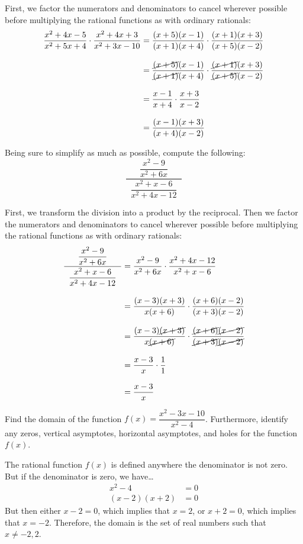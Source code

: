 \documentclass[12pt,letterpaper]{exam}
\begin{document}
\begin{questions}
\sol First, we factor the numerators and denominators to cancel wherever possible before multiplying the rational functions as with ordinary rationals:
	\[
	\begin{aligned}
	\dfrac{x^2 + 4x - 5}{x^2 + 5x + 4} \cdot \dfrac{x^2 + 4x + 3}{x^2 + 3x - 10}&= \dfrac{(x + 5)(x - 1)}{(x + 1)(x + 4)} \cdot \dfrac{(x + 1)(x + 3)}{(x + 5)(x - 2)} \\[0.3cm]
	&= \dfrac{\cancel{(x + 5)}(x - 1)}{\cancel{(x + 1)}(x + 4)} \cdot \dfrac{\cancel{(x + 1)}(x + 3)}{\cancel{(x + 5)}(x - 2)} \\[0.3cm]
	&= \dfrac{x - 1}{x + 4} \cdot \dfrac{x + 3}{x - 2} \\[0.3cm]
	&= \dfrac{(x - 1)(x + 3)}{(x + 4)(x - 2)}
	\end{aligned}
	\]



\newpage
\question[10] Being sure to simplify as much as possible, compute the following:
	\[
	\dfrac{\;\;\dfrac{x^2 - 9}{x^2 + 6x}\;\;}{\;\;\dfrac{x^2 + x - 6}{x^2 + 4x - 12}\;\;}
	\] \pspace

\sol First, we transform the division into a product by the reciprocal. Then we factor the numerators and denominators to cancel wherever possible before multiplying the rational functions as with ordinary rationals:
	\[
	\begin{aligned}
	\dfrac{\;\;\dfrac{x^2 - 9}{x^2 + 6x}\;\;}{\;\;\dfrac{x^2 + x - 6}{x^2 + 4x - 12}\;\;}&= \dfrac{x^2 - 9}{x^2 + 6x} \cdot \dfrac{x^2 + 4x - 12}{x^2 + x - 6} \\[0.3cm]
	&= \dfrac{(x - 3)(x + 3)}{x(x + 6)} \cdot \dfrac{(x + 6)(x - 2)}{(x + 3)(x - 2)} \\[0.3cm]
	&= \dfrac{(x - 3)\cancel{(x + 3)}}{x\cancel{(x + 6)}} \cdot \dfrac{\cancel{(x + 6)}\cancel{(x - 2)}}{\cancel{(x + 3)}\cancel{(x - 2)}} \\[0.3cm]
	&= \dfrac{x - 3}{x} \cdot \dfrac{1}{1} \\[0.3cm]
	&= \dfrac{x - 3}{x}
	\end{aligned}
	\]



\newpage
\question[10] Find the domain of the function $f(x)= \dfrac{x^2 - 3x - 10}{x^2 - 4}$. Furthermore, identify any zeros, vertical asymptotes, horizontal asymptotes, and holes for the function $f(x)$. \pspace

\sol The rational function $f(x)$ is defined anywhere the denominator is not zero. But if the denominator is zero, we have\dots
	\[
	\begin{aligned}
	x^2 - 4&= 0 \\[0.3cm]
	(x - 2)(x + 2)&= 0
	\end{aligned}
	\]
But then either $x - 2=0$, which implies that $x= 2$, or $x + 2= 0$, which implies that $x= -2$. Therefore, the domain is the set of real numbers such that $x \neq -2, 2$. \pspace


\end{questions}
\end{document}
